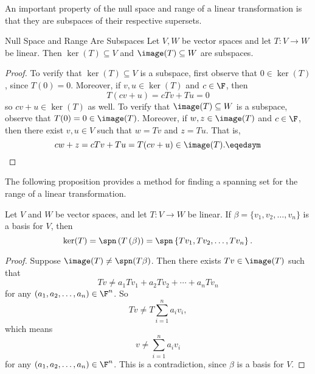 \documentclass[linearalgebra]{subfiles}
\begin{document}
    \begin{remark}
        An important property of the null space and range of a linear transformation is that they are subspaces of their respective supersets.
    \end{remark}

    \begin{prop}{Null Space and Range Are Subspaces}
        Let $V, W$ be vector spaces and let $T:V\to W$ be linear. Then $\ker(T)\subseteq V$ and $\image(T)\subseteq W$ are subspaces.
    \end{prop}

    \begin{proof}
        To verify that $\ker(T)\subseteq V$ is a subspace, first observe that $0\in\ker(T)$, since $T(0)=0$. Moreover, if $v,u\in\ker(T)$ and $c\in\F$, then
        \begin{equation*}
            T(cv+u)=cTv+Tu=0
        \end{equation*}
        so $cv+u\in\ker(T)$ as well. To verify that $\image(T)\subseteq W$ is a subspace, observe that $T(0) = 0\in\image(T)$. Moreover, if $w,z\in\image(T)$ and $c\in\F$, then there exist $v,u\in V$ such that $w=Tv$ and $z=Tu$. That is,
        \begin{equation*}
            cw+z = cTv+Tu = T(cv+u)\in\image(T). \eqedsym
        \end{equation*}
    \end{proof}

    \begin{remark}
        The following proposition provides a method for finding a spanning set for the range of a linear transformation.
    \end{remark}

    \begin{prop}{}
        Let $V$ and $W$ be vector spaces, and let $T: V\to W$ be linear. If $\beta = \lbrace v_1, v_2, \ldots, v_n \rbrace$ is a basis for $V$, then
        \begin{equation*}
            \ker(T) = \spn\left( T\left( \beta \right)  \right) = \spn\left\lbrace Tv_1, Tv_2, \ldots, Tv_n \right\rbrace.
        \end{equation*}
    \end{prop}

    \begin{proof}
        Suppose $\image(T)\neq \spn(T\beta)$. Then there exists $Tv\in \image(T)$ such that
        \begin{equation*}
            Tv\neq a_1Tv_1 + a_2Tv_2 + \cdots + a_nTv_n
        \end{equation*}
        for any $(a_1, a_2, \ldots, a_n)\in \F^n$. So
        \begin{equation*}
            Tv\neq T\sum^n_{i=1}a_iv_i,
        \end{equation*}
        which means
        \begin{equation*}
            v\neq \sum^n_{i=1}a_iv_i
        \end{equation*}
        for any $(a_1, a_2, \ldots, a_n)\in \F^n$. This is a contradiction, since $\beta$ is a basis for $V$.
    \end{proof}
\end{document}
